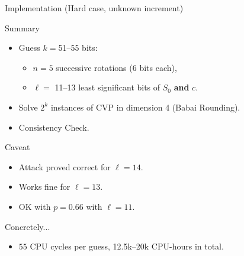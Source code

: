 \begin{frame}[label=bragging]{Implementation (Hard case, unknown increment)}
  \begin{block}{Summary}
    \begin{itemize}
    \item Guess $k=$51--55 bits:
      \begin{itemize}
      \item $n=5$ successive rotations (6 bits each),
      \item $\ell=$ 11--13 least significant bits of \(S_0\) \textbf{and} \alert{$c$}.
      \end{itemize}
    \item Solve \(2^{k}\) instances of CVP in dimension 4 (Babai Rounding).
    \item Consistency Check.
    \end{itemize}
  \end{block}

  \begin{alertblock}{Caveat}
    \begin{itemize}
    \item Attack proved correct for $\ell=14$.
    \item Works fine for $\ell=13$.
    \item OK with $p=0.66$ with $\ell=11$.
    \end{itemize}
  \end{alertblock}
  
  \begin{exampleblock}{Concretely...}
    \begin{itemize}
    \item $55$ CPU cycles per guess, 12.5k--20k CPU-hours in total.
    \end{itemize}
  \end{exampleblock}
\end{frame}


